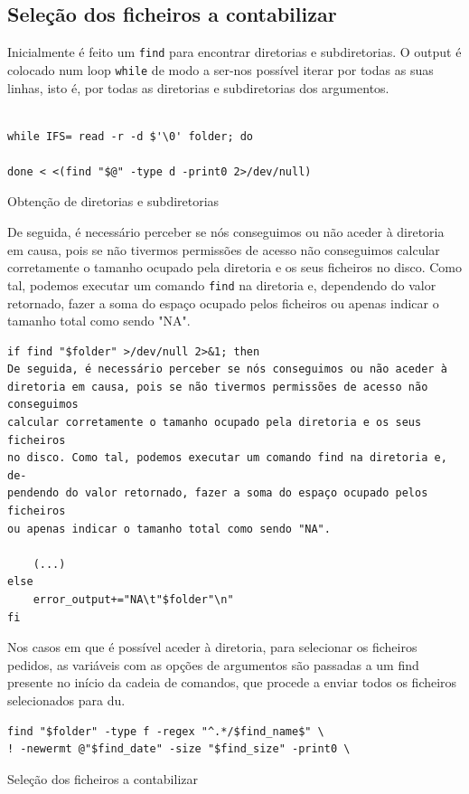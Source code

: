 \subsection{Seleção dos ficheiros a contabilizar}
Inicialmente é feito um \verb|find| para encontrar
diretorias e subdiretorias. O output é colocado num loop
\verb|while| de modo a ser-nos possível iterar por todas as
suas linhas, isto é, por todas as diretorias e
subdiretorias dos argumentos.
\begin{listing}[H]
\begin{verbatim}

while IFS= read -r -d $'\0' folder; do 

done < <(find "$@" -type d -print0 2>/dev/null)
\end{verbatim}
\caption{Obtenção de diretorias e subdiretorias}
\end{listing}
De seguida, é necessário perceber se nós conseguimos ou não
aceder à diretoria em causa, pois se não tivermos permissões
de acesso não conseguimos calcular corretamente o tamanho
ocupado pela diretoria e os seus ficheiros no disco. Como
tal, podemos executar um comando \verb|find| na diretoria
e, dependendo do valor retornado, fazer a soma do espaço
ocupado pelos ficheiros ou apenas indicar o tamanho total
como sendo "NA".
\begin{listing}[H]
\begin{verbatim}
if find "$folder" >/dev/null 2>&1; then
De seguida, é necessário perceber se nós conseguimos ou não aceder à diretoria em causa, pois se não tivermos permissões de acesso não conseguimos
calcular corretamente o tamanho ocupado pela diretoria e os seus ficheiros
no disco. Como tal, podemos executar um comando find na diretoria e, de-
pendendo do valor retornado, fazer a soma do espaço ocupado pelos ficheiros
ou apenas indicar o tamanho total como sendo "NA".

    (...)
else
    error_output+="NA\t"$folder"\n"
fi
\end{verbatim}
\end{listing}
Nos casos em que é possível aceder à diretoria, para
selecionar os ficheiros pedidos, as variáveis com as opções
de argumentos são passadas a um find presente no início da cadeia de comandos,
que procede a enviar todos os ficheiros selecionados para
du.
\begin{listing}[H]
\begin{verbatim}
find "$folder" -type f -regex "^.*/$find_name$" \
! -newermt @"$find_date" -size "$find_size" -print0 \
\end{verbatim}
\caption{Seleção dos ficheiros a contabilizar}
\end{listing}
